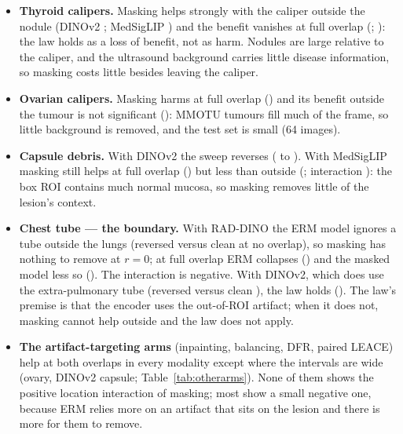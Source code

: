\begin{itemize}[leftmargin=*]\itemsep1pt
\item \textbf{Thyroid calipers.} Masking helps strongly with the caliper outside the nodule (DINOv2
\sTwoThyroidcaliperDINOvTwoZero; MedSigLIP \sTwoThyroidcaliperMedSigLIPZero) and the benefit vanishes at full overlap
(\sTwoThyroidcaliperDINOvTwoFull; \sTwoThyroidcaliperMedSigLIPFull): the law holds as a loss of benefit, not as harm.
Nodules are large relative to the caliper, and the ultrasound background carries little disease information, so
masking costs little besides leaving the caliper.
\item \textbf{Ovarian calipers.} Masking harms at full overlap (\sTwoOvariancaliperDINOvTwoFull) and its benefit outside
the tumour is not significant (\sTwoOvariancaliperDINOvTwoZero): MMOTU tumours fill much of the frame, so little
background is removed, and the test set is small (64 images).
\item \textbf{Capsule debris.} With DINOv2 the sweep reverses (\sTwoCapsuledebrisDINOvTwoZero{} to
\sTwoCapsuledebrisDINOvTwoFull). With MedSigLIP masking still helps at full overlap (\sTwoCapsuledebrisMedSigLIPFull)
but less than outside (\sTwoCapsuledebrisMedSigLIPZero; interaction \sTwoCapsuledebrisMedSigLIPInter): the box ROI
contains much normal mucosa, so masking removes little of the lesion's context.
\item \textbf{Chest tube --- the boundary.} With RAD-DINO the ERM model ignores a tube outside the lungs (reversed
\sTwoCxrErmRevZero{} versus clean \sTwoCxrErmCleanZero{} at no overlap), so masking has nothing to remove at $r=0$; at
full overlap ERM collapses (\sTwoCxrErmRevOneZeroZero) and the masked model less so (\sTwoCxrMaskRevOneZeroZero). The
interaction is negative. With DINOv2, which does use the extra-pulmonary tube (reversed \sTwoCxrDinoErmRevZero{} versus
clean \sTwoCxrDinoErmCleanZero), the law holds (\sTwoChesttubeDINOvTwoInter). The law's premise is that the encoder
uses the out-of-ROI artifact; when it does not, masking cannot help outside and the law does not apply.
\item \textbf{The artifact-targeting arms} (inpainting, balancing, DFR, paired LEACE) help at both overlaps in every
modality except where the intervals are wide (ovary, DINOv2 capsule; Table~\ref{tab:otherarms}). None of them shows the
positive location interaction of masking; most show a small negative one, because ERM relies more on an artifact that
sits on the lesion and there is more for them to remove.
\end{itemize}


